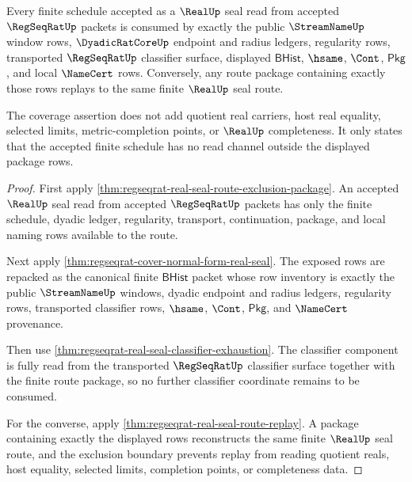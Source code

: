 \begin{theorem}
\label{thm:regseqrat-real-seal-schedule-coverage}
Every finite schedule accepted as a $\RealUp$ seal read from accepted
$\RegSeqRatUp$ packets is consumed by exactly the public $\StreamNameUp$
window rows, $\DyadicRatCoreUp$ endpoint and radius ledgers, regularity rows,
transported $\RegSeqRatUp$ classifier surface, displayed $\mathsf{BHist}$,
$\hsame$, $\Cont$, $\mathsf{Pkg}$, and local $\NameCert$ rows. Conversely,
any route package containing exactly those rows replays to the same finite
$\RealUp$ seal route.

The coverage assertion does not add quotient real carriers, host real
equality, selected limits, metric-completion points, or $\RealUp$
completeness. It only states that the accepted finite schedule has no read
channel outside the displayed package rows.
\end{theorem}
\begin{proof}
First apply
\autoref{thm:regseqrat-real-seal-route-exclusion-package}. An accepted
$\RealUp$ seal read from accepted $\RegSeqRatUp$ packets has only the finite
schedule, dyadic ledger, regularity, transport, continuation, package, and
local naming rows available to the route.

Next apply \autoref{thm:regseqrat-cover-normal-form-real-seal}. The exposed
rows are repacked as the canonical finite $\mathsf{BHist}$ packet whose row
inventory is exactly the public $\StreamNameUp$ windows, dyadic endpoint and
radius ledgers, regularity rows, transported classifier rows, $\hsame$,
$\Cont$, $\mathsf{Pkg}$, and $\NameCert$ provenance.

Then use \autoref{thm:regseqrat-real-seal-classifier-exhaustion}. The
classifier component is fully read from the transported $\RegSeqRatUp$
classifier surface together with the finite route package, so no further
classifier coordinate remains to be consumed.

For the converse, apply \autoref{thm:regseqrat-real-seal-route-replay}. A
package containing exactly the displayed rows reconstructs the same finite
$\RealUp$ seal route, and the exclusion boundary prevents replay from reading
quotient reals, host equality, selected limits, completion points, or
completeness data.
\end{proof}

